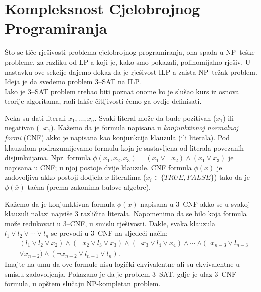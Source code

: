 \documentclass[a4paper, utf8, 11pt, colorlinks]{book}
\begin{document}
 \section{Kompleksnost Cjelobrojnog Programiranja}
   Što se tiče rješivosti problema cjelobrojnog programiranja, ona spada u NP--teške probleme, za razliku od LP-a koji je, kako smo pokazali, polinomijalno rješiv. U nastavku ove sekcije dajemo dokaz da je rješivost ILP-a zaista NP--težak problem.  Ideja je da  svedemo problem 3--SAT na ILP.\\ 
   Iako je 3--SAT problem trebao biti poznat onome ko je slušao kurs iz osnova teorije algoritama, radi lakše čitljivosti ćemo ga ovdje definisati. 
   
   Neka su dati literali $x_1, \ldots, x_n$. Svaki literal može da bude pozitivan ($x_1$) ili negativan  ($\neg x_1$). Kažemo da je formula napisana u \emph{konjunktivnoj normalnoj formi} (CNF) akko je napisana kao konjunkcija klauzula (ili literala). Pod klauzulom podrazumijevamo formulu koja je sastavljena od literala povezanih disjunkcijama. Npr. formula $\phi(x_1, x_2, x_3)= (x_1 \vee  \neg x_2) \wedge (x_1 \vee x_3)$ je napisana u CNF; u njoj postoje dvije klauzule. CNF formula $\phi(x)$ je zadovoljiva akko postoji dodjela $\overline{x}$ literalima ($\overline{x}_i \in \{TRUE, FALSE\}$) tako da je $\phi(\overline{x})$ tačna (prema zakonima bulove algebre).  
   
   Kažemo da je konjunktivna formula $\phi(x)$  napisana u 3--CNF  akko se u svakoj klauzuli nalazi najviše 3 različita literala. Napomenimo da se bilo koja formula može redukovati u 3--CNF, u smislu rješivosti. Dakle, svaka klauzula 
   $l_1 \vee l_2 \vee \cdots \vee l_n$ se prevodi u 3--CNF na sljedeći način:
   \begin{align*}
       &(l_1 \vee l_2 \vee x_2) \wedge ( \neg x_2 \vee l_3 \vee x_3) \wedge ( \neg x_3 \vee l_4 \vee x_4 ) \wedge \cdots \wedge (\neg x_{n-3} \vee l_{n-3} \\
       &\vee x_{n-2} ) \wedge ( \neg x_{n-2} \vee l_{n-1} \vee l_n ).  
    \end{align*}    
      Imajte na umu da ove formule nisu logički ekvivalentne ali su ekvivalentne u smislu zadovoljenja. 
    Pokazano je da je problem 3--SAT, gdje je ulaz 3--CNF formula,  u opštem slučaju NP-kompletan problem.  
    
\end{document}
